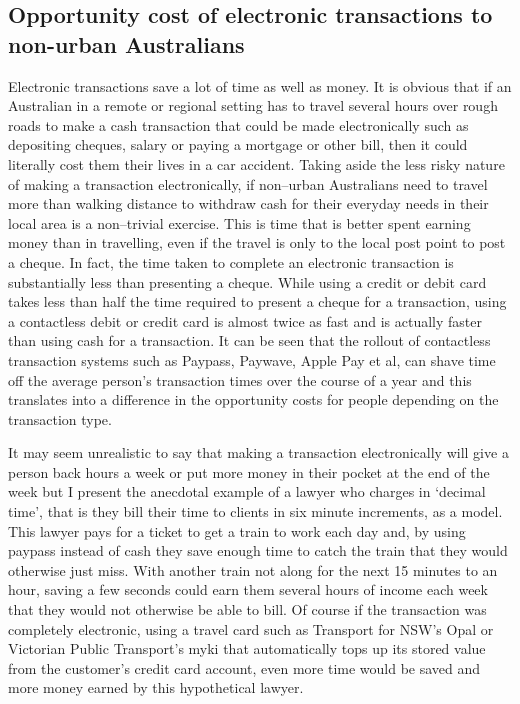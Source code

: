 \subsection{Opportunity cost of electronic transactions to non-urban Australians}
Electronic transactions save a lot of time as well as money. It is obvious that if an Australian in a remote or regional setting has to travel several hours over rough roads to make a cash transaction that could be made electronically such as depositing cheques, salary or paying a mortgage or other bill, then it could literally cost them their lives in a car accident.  Taking aside the less risky nature of making a transaction electronically, if non--urban Australians need to travel more than walking distance to withdraw cash for their everyday needs in their local area is a non--trivial exercise. This is time that is better spent earning money than in travelling, even if the travel is only to the local post point to post a cheque. In fact, the time taken to complete an electronic transaction is substantially less than presenting a cheque. While using a credit or debit card takes less than half the time required to present a cheque for a transaction, using a contactless debit or credit card is almost twice as fast and is actually faster than using cash for a transaction. It can be seen that the rollout of contactless transaction systems such as Paypass, Paywave, Apple Pay et al, can shave time off the average person's transaction times over the course of a year and this translates into a difference in the opportunity costs for people depending on the transaction type.

It may seem unrealistic to say that making a transaction electronically will give a person back hours a week or put more money in their pocket at the end of the week but I present the anecdotal example of a lawyer who charges in `decimal time', that is they  bill their time to clients in six minute increments, as a model. This lawyer pays for a ticket to get a train to work each day and, by using paypass instead of cash they save enough time to catch the train that they would otherwise just miss. With another train not along for the next 15 minutes to an hour, saving a few seconds could earn them several hours of income each week that they would not otherwise be able to bill. Of course if the transaction was completely electronic, using a travel card such as Transport for NSW's Opal or Victorian Public Transport's myki that automatically tops up its stored value from the customer's credit card account, even more time would be saved and more money earned by this hypothetical lawyer.


